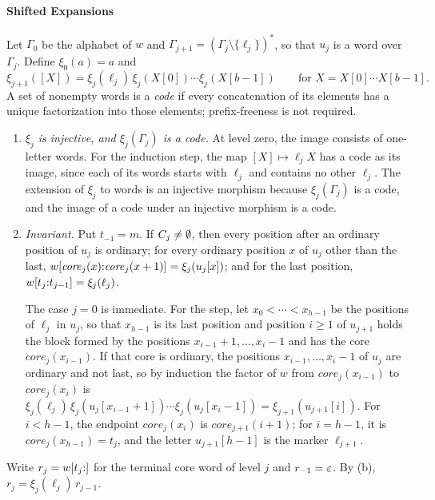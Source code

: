 \paragraph{Shifted Expansions}
Let $\Gamma_0$ be the alphabet of $w$ and $\Gamma_{j+1} = (\Gamma_j \setminus \{\ell_j\})^*$, so that $u_j$ is a
word over $\Gamma_j$. Define $\xi_0(a) = a$ and
\[
  \xi_{j+1}([X]) = \xi_j(\ell_j)\,\xi_j(X[0]) \cdots \xi_j(X[b-1])
  \qquad\text{for } X = X[0]\cdots X[b-1].
\]
A set of nonempty words is a \emph{code} if every concatenation of its
elements has a unique factorization into those elements; prefix-freeness
is not required.
\begin{enumerate}[label=(\alph*),leftmargin=*]
\item \emph{$\xi_j$ is injective, and $\xi_j(\Gamma_j)$ is a code.}
  At level zero, the image consists of one-letter words. For the induction step, the map
  $[X] \mapsto \ell_j X$ has a code as its image, since each of its words starts with $\ell_j$
  and contains no other $\ell_j$. The extension of $\xi_j$ to words is an injective
  morphism because $\xi_j(\Gamma_j)$ is a code, and the image of a code under an injective
  morphism is a code.
\item \emph{Invariant.} Put $t_{-1} = m$. If $C_j \ne \emptyset$, then every position
  after an ordinary position of $u_j$ is ordinary; for every ordinary position $x$ of $u_j$
  other than the last,
  $w[\mathit{core}_j(x){:}\mathit{core}_j(x+1)] = \xi_j(u_j[x])$; and for the last
  position, $w[t_j{:}t_{j-1}] = \xi_j(\ell_j)$.

  The case $j = 0$ is immediate. For the step, let $x_0 < \cdots < x_{h-1}$ be the positions of
  $\ell_j$ in $u_j$, so that $x_{h-1}$ is its last position and position $i \ge 1$ of $u_{j+1}$
  holds the block formed by the positions $x_{i-1}+1, \dots, x_i-1$ and has the core
  $\mathit{core}_j(x_{i-1})$. If that core is ordinary, the positions $x_{i-1}, \dots, x_i - 1$
  of $u_j$ are ordinary and not last, so by induction the factor of $w$ from
  $\mathit{core}_j(x_{i-1})$ to $\mathit{core}_j(x_i)$ is
  $\xi_j(\ell_j)\,\xi_j(u_j[x_{i-1}+1]) \cdots \xi_j(u_j[x_i - 1]) =
  \xi_{j+1}(u_{j+1}[i])$. For $i < h-1$, the endpoint $\mathit{core}_j(x_i)$ is
  $\mathit{core}_{j+1}(i+1)$; for $i = h-1$, it is $\mathit{core}_j(x_{h-1}) = t_j$, and the
  letter $u_{j+1}[h-1]$ is the marker $\ell_{j+1}$.
\end{enumerate}
Write $r_j = w[t_j{:}]$ for the terminal core word of level $j$ and $r_{-1} = \varepsilon$. By
(b), $r_j = \xi_j(\ell_j)\, r_{j-1}$.

